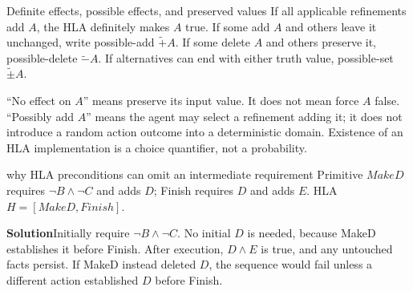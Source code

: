 \documentclass[10pt,a4paper]{article}
\newcommand{\ans}{\par\smallskip\textbf{\color{good}Solution\quad}}
\begin{document}
\begin{card}{Definite effects, possible effects, and preserved values}
If all applicable refinements add $A$, the HLA definitely makes $A$ true. If some add $A$ and others leave it unchanged, write possible-add $\widetilde{+}A$. If some delete $A$ and others preserve it, possible-delete $\widetilde{-}A$. If alternatives can end with either truth value, possible-set $\widetilde{\pm}A$.

``No effect on $A$'' means preserve its input value. It does not mean force $A$ false. ``Possibly add $A$'' means the agent may select a refinement adding it; it does not introduce a random action outcome into a deterministic domain. Existence of an HLA implementation is a choice quantifier, not a probability.
\end{card}

\begin{question}{why HLA preconditions can omit an intermediate requirement}
Primitive $MakeD$ requires $\neg B\land\neg C$ and adds $D$; Finish requires $D$ and adds $E$. HLA $H=[MakeD,Finish]$.
\ans Initially require $\neg B\land\neg C$. No initial $D$ is needed, because MakeD establishes it before Finish. After execution, $D\land E$ is true, and any untouched facts persist. If MakeD instead deleted $D$, the sequence would fail unless a different action established $D$ before Finish.
\end{question}
\end{document}
